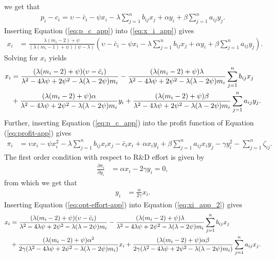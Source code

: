 we get that
\begin{align}
p_i-c_i =  \upsilon - \bar{c}_i  - \psi x_i - \lambda \sum_{j=1}^n b_{ij} x_j + \alpha y_i + \beta \sum_{j=1}^n a_{ij} y_j. 
\label{eq:p_c_app}
\end{align}
Inserting Equation (\ref{eq:p_c_app}) into (\ref{eq:x_i_app}) gives
\begin{align*}
x_i & 
= 
\frac{\lambda (m_i-2)+\psi}{(\lambda (m_i-1)+\psi)(\psi-\lambda)} 
\left(\upsilon - \bar{c}_i  - \psi x_i - \lambda \sum_{j=1}^n b_{ij} x_j + \alpha y_i + \beta \sum_{j=1}^n a_{ij} y_j\right).
\end{align*}
Solving for $x_i$ yields 
\begin{align}
x_i & 
= 
\frac{
(\lambda (m_i-2)+\psi)(\upsilon-\bar{c}_i)
}{
\lambda^2 - 4\lambda\psi + 2\psi^2 - \lambda(\lambda - 2\psi)m_i
} 
- 
\frac{
(\lambda (m_i-2)+\psi) \lambda
}{
\lambda^2 - 4\lambda\psi + 2\psi^2 - \lambda(\lambda - 2\psi)m_i
} 
\sum_{j=1}^n b_{ij} x_j 
\notag \\
& 
+ 
\frac{
(\lambda (m_i-2)+\psi) \alpha
}{
\lambda^2 - 4\lambda\psi + 2\psi^2 - \lambda(\lambda - 2\psi)m_i
} 
y_i
+ 
\frac{
(\lambda (m_i-2)+\psi) \beta
}{
\lambda^2 - 4\lambda\psi + 2\psi^2 - \lambda(\lambda - 2\psi)m_i
} 
\sum_{j=1}^n a_{ij} y_j.
\label{eq:xi_app_2}
\end{align}
Further, inserting Equation (\ref{eq:p_c_app}) into the profit function of Equation (\ref{eq:profit-app}) gives
\begin{align*}
\pi_i & = \upsilon x_i - \psi x_i^2 - \lambda \sum_{j=1}^n b_{ij} x_i x_j - \bar{c}_i x_i + \alpha x_i y_i + \beta \sum_{j=1}^n a_{ij} x_i y_j - \gamma y_i^2 - \sum_{j=1}^n \zeta_{ij}.
\end{align*}
The first order condition with respect to R\&D effort is given by
\begin{align*}
\frac{\partial \pi_i}{\partial y_i} & = \alpha x_i - 2 \gamma y_i = 0,
\end{align*}
from which we get that
\begin{align}
y_i & = \frac{\alpha}{2 \gamma} x_i.
\label{eq:opt-effort-app}
\end{align}
Inserting Equation (\ref{eq:opt-effort-app}) into Equation (\ref{eq:xi_app_2}) gives
\begin{align}
x_i & 
= 
\frac{
(\lambda (m_i-2)+\psi)(\upsilon-\bar{c}_i)
}{
\lambda^2 - 4\lambda\psi + 2\psi^2 - \lambda(\lambda - 2\psi)m_i
} 
- 
\frac{
(\lambda (m_i-2)+\psi) \lambda
}{
\lambda^2 - 4\lambda\psi + 2\psi^2 - \lambda(\lambda - 2\psi)m_i
} 
\sum_{j=1}^n b_{ij} x_j 
\notag \\
& 
+ 
\frac{
(\lambda (m_i-2)+\psi) \alpha^2
}{
2 \gamma (\lambda^2 - 4\lambda\psi + 2\psi^2 - \lambda(\lambda - 2\psi)m_i)
} 
x_i
+ 
\frac{
(\lambda (m_i-2)+\psi) \alpha \beta
}{
2 \gamma(\lambda^2 - 4\lambda\psi + 2\psi^2 - \lambda(\lambda - 2\psi)m_i)
} 
\sum_{j=1}^n a_{ij} x_j.
\label{eq:xi_app_3}
\end{align}
